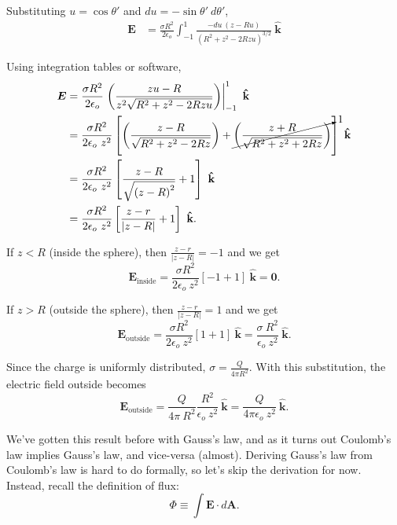 \documentclass{article}
\numberwithin{equation}{section}
\newcommand{\khat}{\mathbf{\hat{k}}}
\newcommand*\Eval[3]{\left.#1\right\rvert_{#2}^{#3}}
\begin{document}
Substituting $u = \cos{\theta'}$ and $du = -\sin{\theta'}\ d\theta'$,
\begin{align*}
    \bm{E} &= \frac{\sigma R^2}{2\epsilon_o} \int_{-1}^{1} \frac{-du\ \left( z - Ru \right)}{\left( R^2 + z^2 - 2Rzu \right)^{3/2}}\ \khat
\end{align*}

Using integration tables or software,
\begin{align*}
    \bm{E} &= \frac{\sigma R^2}{2\epsilon_o} \Eval{\left( \frac{zu - R}{z^2 \sqrt{R^2 + z^2 - 2Rzu}} \right)}{-1}{1}\ \khat \\
    &= \frac{\sigma R^2}{2\epsilon_o\ z^2} \left[ \left( \frac{z - R}{\sqrt{R^2 + z^2 - 2Rz}} \right) + \cancelto{1}{\left( \frac{z + R}{\sqrt{R^2 + z^2 + 2Rz}} \right)} \right]\ \khat \\
    &= \frac{\sigma R^2}{2\epsilon_o\ z^2} \left[ \frac{z - R}{\sqrt{\left( z - R \right)^2}} + 1 \right]\ \khat \\
    &= \frac{\sigma R^2}{2\epsilon_o\ z^2} \left[ \frac{z - r}{\left| z - R \right|} + 1 \right]\ \khat.
\end{align*}

If $z < R$ (inside the sphere), then $\displaystyle \frac{z - r}{\left| z - R \right|} = -1$ and we get
\begin{equation*}
    \bm{E}_{\text{inside}} = \frac{\sigma R^2}{2\epsilon_o\ z^2} \left[ -1 + 1 \right]\ \khat = \bm{0}.
\end{equation*}

If $z > R$ (outside the sphere), then $\displaystyle \frac{z - r}{\left| z - R \right|} = 1$ and we get
\begin{equation*}
    \bm{E}_{\text{outside}} = \frac{\sigma R^2}{2\epsilon_o\ z^2} \left[ 1 + 1 \right]\ \khat = \frac{\sigma\ R^2}{\epsilon_o\ z^2}\ \khat.
\end{equation*}

Since the charge is uniformly distributed, $\displaystyle \sigma = \frac{Q}{4\pi R^2}$. With this substitution, the electric field outside becomes
\begin{equation*}
    \bm{E}_{\text{outside}} = \frac{Q}{4\pi\ R^2} \frac{R^2}{\epsilon_o\ z^2}\ \khat = \frac{Q}{4\pi\epsilon_o\ z^2}\ \khat.
\end{equation*}

We've gotten this result before with Gauss's law, and as it turns out Coulomb's law implies Gauss's law, and vice-versa (almost). Deriving Gauss's law from Coulomb's law is hard to do formally, so let's skip the derivation for now. Instead, recall the definition of flux:
\begin{equation*}
    \Phi \equiv \int \bm{E} \cdot d\bm{A}.
\end{equation*}
\end{document}

